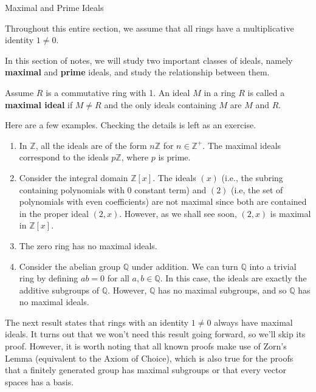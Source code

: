 \begin{section}{Maximal and Prime Ideals}

Throughout this entire section, we assume that all rings have a multiplicative identity $1\neq 0$.

In this section of notes, we will study two important classes of ideals, namely \textbf{maximal} and \textbf{prime} ideals, and study the relationship between them. 

\begin{definition}
Assume $R$ is a commutative ring with 1. An ideal $M$ in a ring $R$ is called a \textbf{maximal ideal} if $M\neq R$ and the only ideals containing $M$ are $M$ and $R$.
\end{definition}

\begin{example}
Here are a few examples.  Checking the details is left as an exercise.
\begin{enumerate}[label=\rm{(\arabic*)}]
\item In $\mathbb{Z}$, all the ideals are of the form $n\mathbb{Z}$ for $n\in\mathbb{Z}^+$.  The maximal ideals correspond to the ideals $p\mathbb{Z}$, where $p$ is prime.
\item Consider the integral domain $\mathbb{Z}[x]$.  The ideals $(x)$ (i.e., the subring containing polynomials with 0 constant term) and $(2)$ (i.e, the set of polynomials with even coefficients) are not maximal since both are contained in the proper ideal $(2,x)$.  However, as we shall see soon, $(2,x)$ is maximal in $\mathbb{Z}[x]$.
\item The zero ring has no maximal ideals.
\item Consider the abelian group $\mathbb{Q}$ under addition.  We can turn $\mathbb{Q}$ into a trivial ring by defining $ab=0$ for all $a,b\in\mathbb{Q}$.  In this case, the ideals are exactly the additive subgroups of $\mathbb{Q}$.  However, $\mathbb{Q}$ has no maximal subgroups, and so $\mathbb{Q}$ has no maximal ideals.
\end{enumerate}
\end{example}

The next result states that rings with an identity $1\neq 0$ always have maximal ideals.  It turns out that we won't need this result going forward, so we'll skip its proof.  However, it is worth noting that all known proofs make use of Zorn's Lemma (equivalent to the Axiom of Choice), which is also true for the proofs that a finitely generated group has maximal subgroups or that every vector spaces has a basis.


\end{section}
